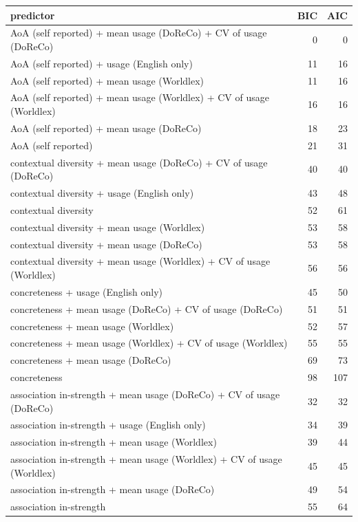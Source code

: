 \begin{table}[ht]
\centering
\begin{tabular}{lrr}
  \hline
predictor & BIC & AIC \\ 
  \hline
AoA (self reported) + mean usage (DoReCo) + CV of usage (DoReCo) & 0 & 0 \\ 
  AoA (self reported) + usage (English only) & 11 & 16 \\ 
  AoA (self reported) + mean usage (Worldlex) & 11 & 16 \\ 
  AoA (self reported) + mean usage (Worldlex) + CV of usage (Worldlex) & 16 & 16 \\ 
  AoA (self reported) + mean usage (DoReCo) & 18 & 23 \\ 
  AoA (self reported) & 21 & 31 \\ 
  contextual diversity + mean usage (DoReCo) + CV of usage (DoReCo) & 40 & 40 \\ 
  contextual diversity + usage (English only) & 43 & 48 \\ 
  contextual diversity & 52 & 61 \\ 
  contextual diversity + mean usage (Worldlex) & 53 & 58 \\ 
  contextual diversity + mean usage (DoReCo) & 53 & 58 \\ 
  contextual diversity + mean usage (Worldlex) + CV of usage (Worldlex) & 56 & 56 \\ 
  concreteness + usage (English only) & 45 & 50 \\ 
  concreteness + mean usage (DoReCo) + CV of usage (DoReCo) & 51 & 51 \\ 
  concreteness + mean usage (Worldlex) & 52 & 57 \\ 
  concreteness + mean usage (Worldlex) + CV of usage (Worldlex) & 55 & 55 \\ 
  concreteness + mean usage (DoReCo) & 69 & 73 \\ 
  concreteness & 98 & 107 \\ 
  association in-strength + mean usage (DoReCo) + CV of usage (DoReCo) & 32 & 32 \\ 
  association in-strength + usage (English only) & 34 & 39 \\ 
  association in-strength + mean usage (Worldlex) & 39 & 44 \\ 
  association in-strength + mean usage (Worldlex) + CV of usage (Worldlex) & 45 & 45 \\ 
  association in-strength + mean usage (DoReCo) & 49 & 54 \\ 
  association in-strength & 55 & 64 \\ 

\end{tabular}
\end{table}
